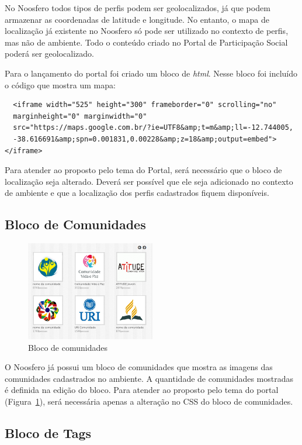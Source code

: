 \documentclass[[a4paper,11pt]{article}
\begin{document}
No Noosfero todos tipos de perfis podem ser geolocalizados, já que podem
armazenar as coordenadas de latitude e longitude. No entanto, o mapa de localização
já existente no Noosfero só pode ser utilizado no contexto de perfis,
mas não de ambiente. Todo o conteúdo criado no Portal de Participação Social poderá ser
geolocalizado. 

Para o lançamento do portal foi criado um
bloco de {\it html}. Nesse bloco foi incluído o código que mostra um
mapa:

{\scriptsize
  \begin{verbatim}
  <iframe width="525" height="300" frameborder="0" scrolling="no"
  marginheight="0" marginwidth="0"
  src="https://maps.google.com.br/?ie=UTF8&amp;t=m&amp;ll=-12.744005,
  -38.616691&amp;spn=0.001831,0.00228&amp;z=18&amp;output=embed"></iframe>
  \end{verbatim}
}

Para atender ao proposto pelo tema do Portal, será necessário que o
bloco de localização seja alterado. Deverá ser possível que ele seja
adicionado no contexto de ambiente e que a localização dos perfis
cadastrados fiquem disponíveis.

\subsection{Bloco de Comunidades}

\begin{figure}[h]
\center
\includegraphics[scale=0.4]{bloco-comunidades.png}
\caption{Bloco de comunidades}
\label{fig:bloco-comunidades}
\end{figure}

O Noosfero já possui um bloco de comunidades que mostra as imagens das
comunidades cadastrados no ambiente. A quantidade de comunidades
mostradas é definida na edição do bloco. Para atender ao
proposto pelo tema do portal (Figura~\ref{fig:bloco-comunidades}), será
necessária apenas a alteração no CSS do bloco de comunidades.

\subsection{Bloco de Tags}
\end{document}
